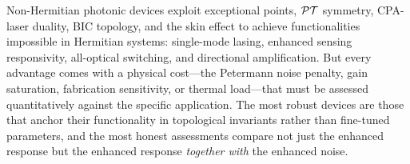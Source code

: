 \begin{takeaway}
Non-Hermitian photonic devices exploit exceptional points, $\mathcal{PT}$
symmetry, CPA-laser duality, BIC topology, and the skin effect to
achieve functionalities impossible in Hermitian systems: single-mode
lasing, enhanced sensing responsivity, all-optical switching, and
directional amplification. But every advantage comes with a physical
cost---the Petermann noise penalty, gain saturation, fabrication
sensitivity, or thermal load---that must be assessed quantitatively
against the specific application. The most robust devices are those
that anchor their functionality in topological invariants rather than
fine-tuned parameters, and the most honest assessments compare not just
the enhanced response but the enhanced response \emph{together with}
the enhanced noise.
\end{takeaway}
